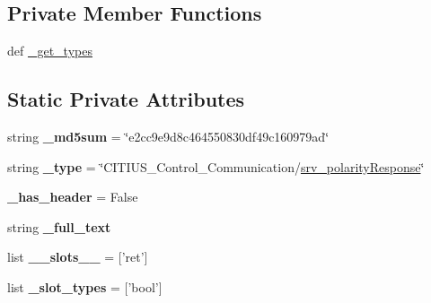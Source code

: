\subsection*{\-Private \-Member \-Functions}
\begin{DoxyCompactItemize}
\item 
def \hyperlink{class_c_i_t_i_u_s___control___communication_1_1srv_1_1__srv__polarity_1_1srv__polarity_response_a1f63979fa307307e4aea3d3ea52399e1}{\-\_\-get\-\_\-types}
\end{DoxyCompactItemize}
\subsection*{\-Static \-Private \-Attributes}
\begin{DoxyCompactItemize}
\item 
\hypertarget{class_c_i_t_i_u_s___control___communication_1_1srv_1_1__srv__polarity_1_1srv__polarity_response_a8bbb9e01f3696ad0eff036f86b166161}{string {\bfseries \-\_\-md5sum} = \char`\"{}e2cc9e9d8c464550830df49c160979ad\char`\"{}}\label{class_c_i_t_i_u_s___control___communication_1_1srv_1_1__srv__polarity_1_1srv__polarity_response_a8bbb9e01f3696ad0eff036f86b166161}

\item 
\hypertarget{class_c_i_t_i_u_s___control___communication_1_1srv_1_1__srv__polarity_1_1srv__polarity_response_a22833ac1e698f76fbdf8452cec2fc03e}{string {\bfseries \-\_\-type} = \char`\"{}\-C\-I\-T\-I\-U\-S\-\_\-\-Control\-\_\-\-Communication/\hyperlink{class_c_i_t_i_u_s___control___communication_1_1srv_1_1__srv__polarity_1_1srv__polarity_response}{srv\-\_\-polarity\-Response}\char`\"{}}\label{class_c_i_t_i_u_s___control___communication_1_1srv_1_1__srv__polarity_1_1srv__polarity_response_a22833ac1e698f76fbdf8452cec2fc03e}

\item 
\hypertarget{class_c_i_t_i_u_s___control___communication_1_1srv_1_1__srv__polarity_1_1srv__polarity_response_aa25aa9c43a48133506ec5de08ce9f6a1}{{\bfseries \-\_\-has\-\_\-header} = \-False}\label{class_c_i_t_i_u_s___control___communication_1_1srv_1_1__srv__polarity_1_1srv__polarity_response_aa25aa9c43a48133506ec5de08ce9f6a1}

\item 
string {\bfseries \-\_\-full\-\_\-text}
\item 
\hypertarget{class_c_i_t_i_u_s___control___communication_1_1srv_1_1__srv__polarity_1_1srv__polarity_response_a517c05e7ceb96e4131facac1eca82e69}{list {\bfseries \-\_\-\-\_\-slots\-\_\-\-\_\-} = \mbox{[}'ret'\mbox{]}}\label{class_c_i_t_i_u_s___control___communication_1_1srv_1_1__srv__polarity_1_1srv__polarity_response_a517c05e7ceb96e4131facac1eca82e69}

\item 
\hypertarget{class_c_i_t_i_u_s___control___communication_1_1srv_1_1__srv__polarity_1_1srv__polarity_response_ae0f1bca17d98bb05975b63be6eac621d}{list {\bfseries \-\_\-slot\-\_\-types} = \mbox{[}'bool'\mbox{]}}\label{class_c_i_t_i_u_s___control___communication_1_1srv_1_1__srv__polarity_1_1srv__polarity_response_ae0f1bca17d98bb05975b63be6eac621d}

\end{DoxyCompactItemize}


